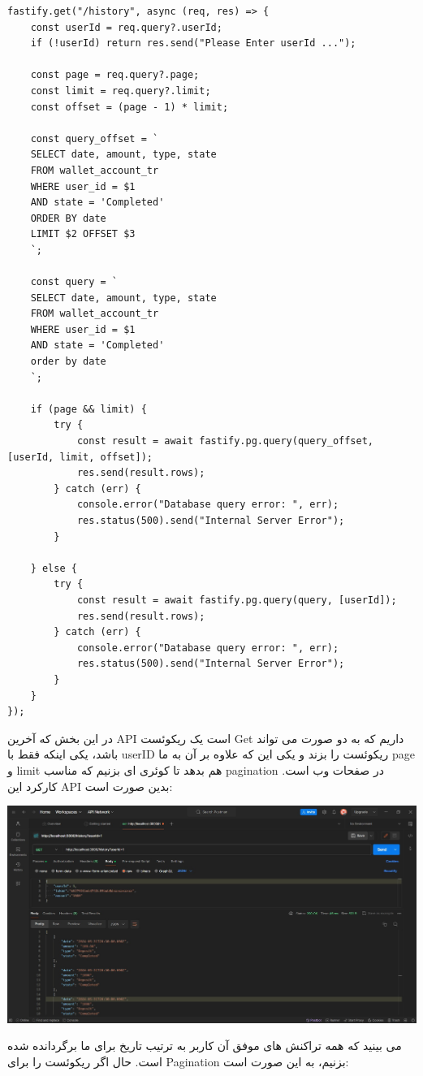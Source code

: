 \pagebreak
\setLTR
\begin{lstlisting} 
fastify.get("/history", async (req, res) => {
    const userId = req.query?.userId;
    if (!userId) return res.send("Please Enter userId ...");

    const page = req.query?.page;
    const limit = req.query?.limit;
    const offset = (page - 1) * limit;

    const query_offset = `
    SELECT date, amount, type, state
    FROM wallet_account_tr
    WHERE user_id = $1
    AND state = 'Completed'
    ORDER BY date
    LIMIT $2 OFFSET $3
    `;

    const query = `
    SELECT date, amount, type, state
    FROM wallet_account_tr
    WHERE user_id = $1
    AND state = 'Completed'
    order by date
    `;

    if (page && limit) {
        try {
            const result = await fastify.pg.query(query_offset, [userId, limit, offset]);
            res.send(result.rows);
        } catch (err) {
            console.error("Database query error: ", err);
            res.status(500).send("Internal Server Error");
        }

    } else {
        try {
            const result = await fastify.pg.query(query, [userId]);
            res.send(result.rows);
        } catch (err) {
            console.error("Database query error: ", err);
            res.status(500).send("Internal Server Error");
        }
    }
});
\end{lstlisting}
\setRTL
در این بخش که آخرین API است یک ریکوئست Get داریم که به دو صورت می تواند باشد، یکی اینکه فقط با userID ریکوئست را بزند و یکی این که علاوه بر آن به ما page و limit هم بدهد تا کوئری ای بزنیم که مناسب pagination در صفحات وب است. کارکرد این API بدین صورت است:

\qquad \qquad \qquad \includegraphics[width=0.7\linewidth]{figs/api4.jpg}

می بینید که همه تراکنش های موفق آن کاربر به ترتیب تاریخ برای ما برگردانده شده است. 
حال اگر ریکوئست را برای Pagination بزنیم، به این صورت است:

